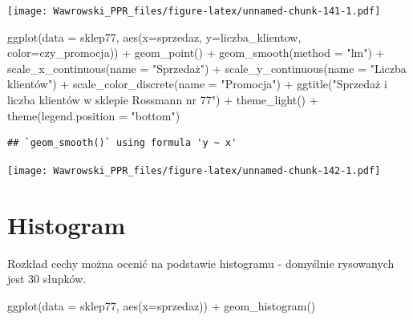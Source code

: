 \documentclass[
]{book}
\newenvironment{Shaded}{\begin{snugshade}}{\end{snugshade}}
\newcommand{\AttributeTok}[1]{\textcolor[rgb]{0.77,0.63,0.00}{#1}}
\newcommand{\FunctionTok}[1]{\textcolor[rgb]{0.00,0.00,0.00}{#1}}
\newcommand{\NormalTok}[1]{#1}
\newcommand{\SpecialCharTok}[1]{\textcolor[rgb]{0.00,0.00,0.00}{#1}}
\newcommand{\StringTok}[1]{\textcolor[rgb]{0.31,0.60,0.02}{#1}}
\begin{document}
\texttt{[image: Wawrowski\_PPR\_files/figure-latex/unnamed-chunk-141-1.pdf]}

\begin{Shaded}
\begin{Highlighting}[]
\FunctionTok{ggplot}\NormalTok{(}\AttributeTok{data =}\NormalTok{ sklep77, }\FunctionTok{aes}\NormalTok{(}\AttributeTok{x=}\NormalTok{sprzedaz, }\AttributeTok{y=}\NormalTok{liczba\_klientow, }\AttributeTok{color=}\NormalTok{czy\_promocja)) }\SpecialCharTok{+}
  \FunctionTok{geom\_point}\NormalTok{() }\SpecialCharTok{+}
  \FunctionTok{geom\_smooth}\NormalTok{(}\AttributeTok{method =} \StringTok{"lm"}\NormalTok{) }\SpecialCharTok{+}
  \FunctionTok{scale\_x\_continuous}\NormalTok{(}\AttributeTok{name =} \StringTok{"Sprzedaż"}\NormalTok{) }\SpecialCharTok{+}
  \FunctionTok{scale\_y\_continuous}\NormalTok{(}\AttributeTok{name =} \StringTok{"Liczba klientów"}\NormalTok{) }\SpecialCharTok{+}
  \FunctionTok{scale\_color\_discrete}\NormalTok{(}\AttributeTok{name =} \StringTok{"Promocja"}\NormalTok{) }\SpecialCharTok{+}
  \FunctionTok{ggtitle}\NormalTok{(}\StringTok{"Sprzedaż i liczba klientów w sklepie Rossmann nr 77"}\NormalTok{) }\SpecialCharTok{+}
  \FunctionTok{theme\_light}\NormalTok{() }\SpecialCharTok{+}
  \FunctionTok{theme}\NormalTok{(}\AttributeTok{legend.position =} \StringTok{"bottom"}\NormalTok{)}
\end{Highlighting}
\end{Shaded}

\begin{verbatim}
## `geom_smooth()` using formula 'y ~ x'
\end{verbatim}

\texttt{[image: Wawrowski\_PPR\_files/figure-latex/unnamed-chunk-142-1.pdf]}

\hypertarget{histogram}{%
\section{Histogram}\label{histogram}}

Rozkład cechy można ocenić na podstawie histogramu - domyślnie rysowanych jest 30 słupków.

\begin{Shaded}
\begin{Highlighting}[]
\FunctionTok{ggplot}\NormalTok{(}\AttributeTok{data =}\NormalTok{ sklep77, }\FunctionTok{aes}\NormalTok{(}\AttributeTok{x=}\NormalTok{sprzedaz)) }\SpecialCharTok{+}
  \FunctionTok{geom\_histogram}\NormalTok{()}
\end{Highlighting}
\end{Shaded}
\end{document}
